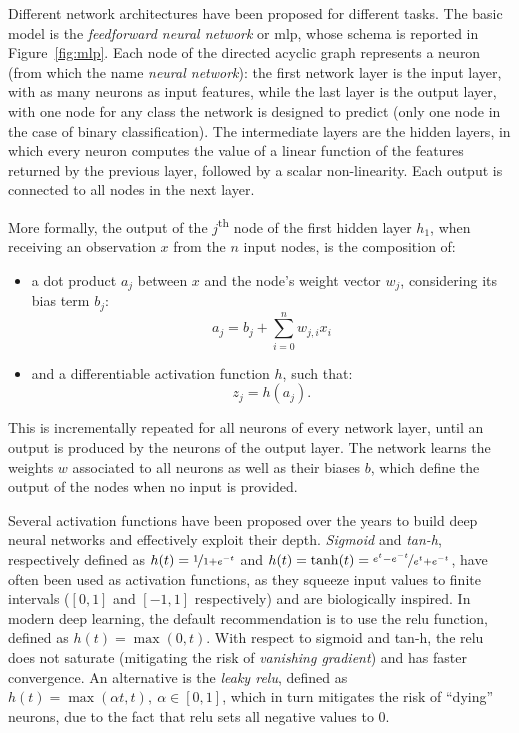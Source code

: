 \documentclass[%
    corpo=12pt,
    twoside,
    stile=classica,   
    tipotesi=magistrale,
    evenboxes,
    english,
	numerazioneromana,
]{toptesi}
\newcommand{\quotes}[1]{``#1''}
\begin{document}
\medskip
Different network architectures have been proposed for different tasks. The basic model is the \textit{feedforward neural network} or \gls{mlp}, whose schema is reported in Figure~\ref{fig:mlp}. Each node of the directed acyclic graph represents a neuron (from which the name \textit{neural network}): the first network layer is the input layer, with as many neurons as input features, while the last layer is the output layer, with one node for any class the network is designed to predict (only one node in the case of binary classification). The intermediate layers are the hidden layers, in which every neuron computes the value of a linear function of the features returned by the previous layer, followed by a scalar non-linearity. Each output is connected to all nodes in the next layer.

\bigskip
More formally, the output of the $j$\textsuperscript{th} node of the first hidden layer $h_1$, when receiving an observation $x$ from the $n$ input nodes, is the composition of:
\begin{itemize}
	\item a dot product $a_j$ between $x$ and the node's weight vector $w_j$, considering its bias term $b_j$:
	\begin{equation*}
		a_j = b_j + \sum_{i=0}^n w_{j,i}x_i
	\end{equation*}
	\item and a differentiable activation function $h$, such that:
	\begin{equation*}
		z_j = h(a_j)\text{.}
	\end{equation*}
\end{itemize}
This is incrementally repeated for all neurons of every network layer, until an output is produced by the neurons of the output layer. The network learns the weights $w$ associated to all neurons as well as their biases $b$, which define the output of the nodes when no input is provided\cite{amini2015apprentissage}.

\bigskip
Several activation functions have been proposed over the years to build deep neural networks and effectively exploit their depth. \textit{Sigmoid} and \textit{tan-h}, respectively defined as $h(t) = \nicefrac{1}{1 + e^{-t}}$ and $h(t) = \tanh(t) = \nicefrac{e^t - e^{-t}}{e^t + e^{-t}}$, have often been used as activation functions, as they squeeze input values to finite intervals ($[0,1]$ and $[-1,1]$ respectively) and are biologically inspired. In modern deep learning, the default recommendation is to use the \gls{relu} function, defined as $h(t) = \max(0,t)$. With respect to sigmoid and tan-h, the \gls{relu} does not saturate (mitigating the risk of \textit{vanishing gradient}) and has faster convergence. An alternative is the \textit{leaky \gls{relu}}, defined as $h(t) = \max(\alpha t, t),\ \alpha \in [0,1]$, which in turn mitigates the risk of \quotes{dying} neurons, due to the fact that \gls{relu} sets all negative values to $0$.
\end{document}
